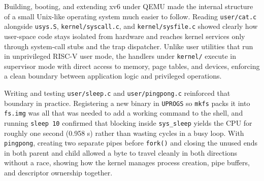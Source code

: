 \documentclass{assets/utmreport}
\begin{document}
\utmconclusions
Building, booting, and extending xv6 under QEMU made the internal structure of a small Unix-like operating system much easier to follow. Reading \texttt{user/cat.c} alongside \texttt{usys.S}, \texttt{kernel/syscall.c}, and \texttt{kernel/sysfile.c} showed clearly how user-space code stays isolated from hardware and reaches kernel services only through system-call stubs and the trap dispatcher. Unlike user utilities that run in unprivileged RISC-V user mode, the handlers under \texttt{kernel/} execute in supervisor mode with direct access to memory, page tables, and devices, enforcing a clean boundary between application logic and privileged operations.

Writing and testing \texttt{user/sleep.c} and \texttt{user/pingpong.c} reinforced that boundary in practice. Registering a new binary in \texttt{UPROGS} so \texttt{mkfs} packs it into \texttt{fs.img} was all that was needed to add a working command to the shell, and running \texttt{sleep 10} confirmed that blocking inside \texttt{sys\_sleep} yields the CPU for roughly one second (0.958 s) rather than wasting cycles in a busy loop. With \texttt{pingpong}, creating two separate pipes before \texttt{fork()} and closing the unused ends in both parent and child allowed a byte to travel cleanly in both directions without a race, showing how the kernel manages process creation, pipe buffers, and descriptor ownership together.
\end{document}
